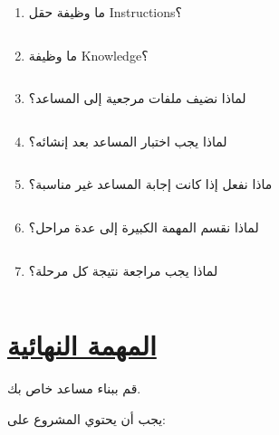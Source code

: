 \documentclass[a4paper]{article}
\begin{document}
\begin{enumerate}

    \item ما وظيفة حقل
    \textenglish{Instructions}؟

    \[
    \boxed{\hspace{15cm}}
    \]

    \item ما وظيفة
    \textenglish{Knowledge}؟

    \[
    \boxed{\hspace{15cm}}
    \]

    \item لماذا نضيف ملفات مرجعية إلى المساعد؟

    \[
    \boxed{\hspace{15cm}}
    \]

    \item لماذا يجب اختبار المساعد بعد إنشائه؟

    \[
    \boxed{\hspace{15cm}}
    \]

    \item ماذا نفعل إذا كانت إجابة المساعد غير مناسبة؟

    \[
    \boxed{\hspace{15cm}}
    \]

    \item لماذا نقسم المهمة الكبيرة إلى عدة مراحل؟

    \[
    \boxed{\hspace{15cm}}
    \]

    \item لماذا يجب مراجعة نتيجة كل مرحلة؟

    \[
    \boxed{\hspace{15cm}}
    \]

\end{enumerate}



\section*{\khatt\underline{المهمة النهائية}}

قم ببناء مساعد خاص بك.

يجب أن يحتوي المشروع على:
\end{document}
